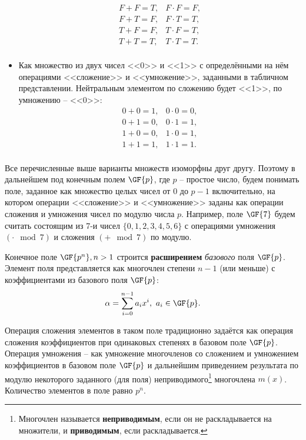 \begin{itemize}
\[\begin{array}{ll}
	F + F = T,	& 	F \cdot F = F, \\
	F + T = F,	& 	F \cdot T = T, \\
	T + F = F,	& 	T \cdot F = T, \\
	T + T = T,	& 	T \cdot T = T. \\
\end{array}\]
	\item Как множество из двух чисел <<0>> и <<1>> с определёнными на нём операциями <<сложение>> и <<умножение>>, заданными в табличном представлении. Нейтральным элементом по сложению будет <<1>>, по умножению -- <<0>>:
\[\begin{array}{ll}
	0 + 0 = 1,	& 	0 \cdot 0 = 0, \\
	0 + 1 = 0,	& 	0 \cdot 1 = 1, \\
	1 + 0 = 0,	& 	1 \cdot 0 = 1, \\
	1 + 1 = 1,	& 	1 \cdot 1 = 1. \\
\end{array}\]
\end{itemize}

Все перечисленные выше варианты множеств изоморфны друг другу. Поэтому в дальнейшем под конечным полем $\GF{p}$, где $p$ -- простое число, будем понимать поле, заданное как множество целых чисел от $0$ до $p-1$ включительно, на котором операции <<сложение>> и <<умножение>> заданы как операции сложения и умножения чисел по модулю числа $p$. Например, поле $\GF{7}$ будем считать состоящим из 7-и чисел $\{0, 1, 2, 3, 4, 5, 6\}$ с операциями умножения $(\cdot \mod 7)$ и сложения $(+ \mod 7)$ по модулю.

Конечное поле $\GF{p^n}, n > 1$ строится \textbf{расширением} \emph{базового} поля $\GF{p}$. Элемент поля представляется как многочлен степени $n-1$ (или меньше) с коэффициентами из базового поля $\GF{p}$:
    \[ \alpha = \sum\limits_{i=0}^{n-1} a_i x^i, ~ a_i \in \GF{p}. \]

Операция сложения элементов в таком поле традиционно задаётся как операция сложения коэффициентов при одинаковых степенях в базовом поле $\GF{p}$. Операция умножения -- как умножение многочленов со сложением и умножением коэффициентов в базовом поле $\GF{p}$ и дальнейшим приведением результата по модулю некоторого заданного (для поля) неприводимого\footnote{Многочлен называется \textbf{неприводимым}, если он не раскладывается на множители, и \textbf{приводимым}, если раскладывается.} многочлена $m(x)$. Количество элементов в поле равно $p^n$.

